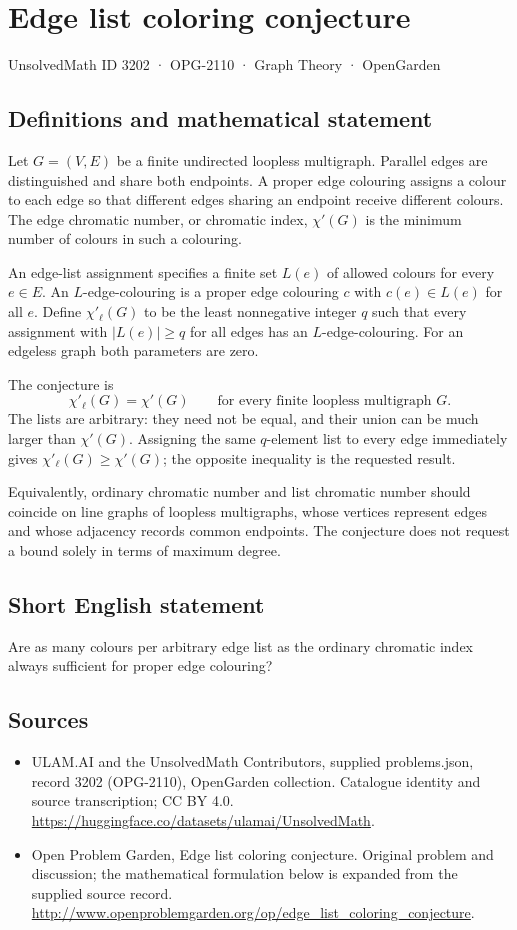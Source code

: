 \documentclass[11pt,a4paper]{article}
\begin{document}
\section*{Edge list coloring conjecture}\label{3202}
{\small UnsolvedMath ID 3202 · OPG-2110 · Graph Theory · OpenGarden}
\subsection{Definitions and mathematical statement}
Let $G=(V,E)$ be a finite undirected loopless
multigraph. Parallel edges are distinguished
and share both endpoints. A proper edge
colouring assigns a colour to each edge
so that different edges sharing an endpoint
receive different colours. The edge chromatic
number, or chromatic index, $\chi'(G)$ is
the minimum number of colours in such a
colouring.

An edge-list assignment specifies a finite
set $L(e)$ of allowed colours for every
$e\in E$. An $L$-edge-colouring is a proper
edge colouring $c$ with $c(e)\in L(e)$
for all $e$. Define $\chi'_\ell(G)$ to
be the least nonnegative integer $q$ such
that every assignment with $|L(e)|\geq q$
for all edges has an $L$-edge-colouring.
For an edgeless graph both parameters
are zero.

The conjecture is
\[
 \chi'_\ell(G)=\chi'(G)
 \qquad\text{for every finite loopless multigraph }G.
\]
The lists are arbitrary: they need not
be equal, and their union can be much
larger than $\chi'(G)$. Assigning the same
$q$-element list to every edge immediately
gives $\chi'_\ell(G)\geq\chi'(G)$; the
opposite inequality is the requested result.

Equivalently, ordinary chromatic number and
list chromatic number should coincide on
line graphs of loopless multigraphs, whose
vertices represent edges and whose adjacency
records common endpoints. The conjecture
does not request a bound solely in terms
of maximum degree.
\subsection{Short English statement}
Are as many colours per arbitrary edge list as the ordinary chromatic index always sufficient for proper edge colouring?
\subsection{Sources}
\begin{itemize}
\item[S1] ULAM.AI and the UnsolvedMath Contributors, supplied problems.json, record 3202 (OPG-2110), OpenGarden collection. Catalogue identity and source transcription; CC BY 4.0.
\url{https://huggingface.co/datasets/ulamai/UnsolvedMath}.
\item[S2] Open Problem Garden, Edge list coloring conjecture. Original problem and discussion; the mathematical formulation below is expanded from the supplied source record.
\url{http://www.openproblemgarden.org/op/edge_list_coloring_conjecture}.
\end{itemize}
\end{document}
